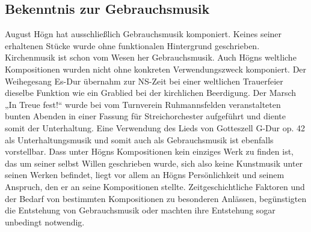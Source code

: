 \documentclass[a4paper]{article}
\begin{document}
\subsection[Bekenntnis zur Gebrauchsmusik]{Bekenntnis zur
Gebrauchsmusik}
\hypertarget{RefHeadingToc100333745}{}August Högn hat ausschließlich
Gebrauchsmusik komponiert. Keines seiner erhaltenen Stücke wurde ohne
funktionalen Hintergrund geschrieben. Kirchenmusik ist schon vom Wesen
her Gebrauchsmusik. Auch Högns weltliche Kompositionen wurden nicht
ohne konkreten Verwendungszweck komponiert. Der Weihegesang Es-Dur
übernahm zur NS-Zeit bei einer weltlichen Trauerfeier dieselbe Funktion
wie ein Grablied bei der kirchlichen Beerdigung. Der Marsch „In Treue
fest!“ wurde bei vom Turnverein Ruhmannsfelden veranstalteten bunten
Abenden in einer Fassung für Streichorchester aufgeführt und diente
somit der Unterhaltung. Eine Verwendung des Lieds von Gotteszell G-Dur
op. 42 als Unterhaltungsmusik und somit auch als Gebrauchsmusik ist
ebenfalls vorstellbar. Dass unter Högns Kompositionen kein einziges
Werk zu finden ist, das um seiner selbst Willen geschrieben wurde, sich
also keine Kunstmusik unter seinen Werken befindet, liegt vor allem an
Högns Persönlichkeit und seinem Anspruch, den er an seine Kompositionen
stellte. Zeitgeschichtliche Faktoren und der Bedarf von bestimmten
Kompositionen zu besonderen Anlässen, begünstigten die Entstehung von
Gebrauchsmusik oder machten ihre Entstehung sogar unbedingt notwendig.
\end{document}
